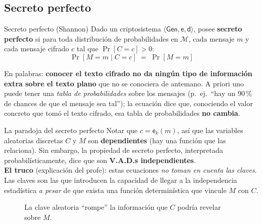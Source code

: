 \documentclass[11pt,a4paper]{article}
\newcommand{\Mset}{\mathcal{M}}
\newcommand{\Gen}{\mathsf{Gen}}
\newcommand{\E}{\mathsf{e}}
\newcommand{\D}{\mathsf{d}}
\begin{document}
\subsection{Secreto perfecto}

\begin{defbox}{Secreto perfecto (Shannon)}
Dado un criptosistema $\langle \Gen,\E,\D\rangle$, posee \textbf{secreto perfecto} si
para toda distribución de probabilidades en $\Mset$, cada mensaje $m$ y cada mensaje
cifrado $c$ tal que $\Pr[C=c]>0$:
\[
  \boxed{\ \Pr[M=m \mid C=c] \;=\; \Pr[M=m]\ }
\]
\end{defbox}

En palabras: \textbf{conocer el texto cifrado no da ningún tipo de información extra
sobre el texto plano} que no se conociera de antemano. A priori uno puede tener una
\emph{tabla de probabilidades} sobre los mensajes (p.\ ej.\ ``hay un 90\,\% de chances de
que el mensaje sea tal''); la ecuación dice que, conociendo el valor concreto que tomó
el texto cifrado, esa tabla de probabilidades \textbf{no cambia}.

\begin{warnbox}{La paradoja del secreto perfecto}
Notar que $c=\E_k(m)$, así que las variables aleatorias discretas $C$ y $M$ son
\textbf{dependientes} (hay una función que las relaciona). Sin embargo, la propiedad de
secreto perfecto, interpretada probabilísticamente, dice que son
\textbf{V.A.D.s independientes}.\\[4pt]
\textbf{El truco} (explicación del profe): estas ecuaciones \emph{no toman en cuenta las
claves}. Las claves son las que introducen la capacidad de llegar a la independencia
estadística \emph{a pesar} de que exista una función determinística que vincule $M$ con $C$.
\end{warnbox}

\begin{figure}[h]
\centering
{}
\caption{La clave aleatoria ``rompe'' la información que $C$ podría revelar sobre $M$.}
\end{figure}
\end{document}

